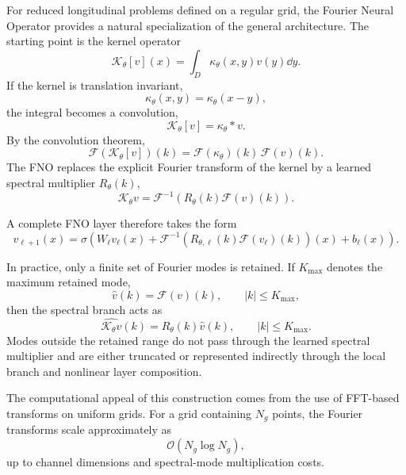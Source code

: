 For reduced longitudinal problems defined on a regular grid, the Fourier Neural Operator provides a natural specialization of the general architecture. The starting point is the kernel operator
\begin{equation}
\mathcal{K}_{\theta}[v](x)
=
\int_D
\kappa_{\theta}(x,y)
v(y)
\dd y.
\end{equation}
If the kernel is translation invariant,
\begin{equation}
\kappa_{\theta}(x,y)
=
\kappa_{\theta}(x-y),
\end{equation}
the integral becomes a convolution,
\begin{equation}
\mathcal{K}_{\theta}[v]
=
\kappa_{\theta}*v.
\end{equation}
By the convolution theorem,
\begin{equation}
\mathcal{F}
\left(
\mathcal{K}_{\theta}[v]
\right)(k)
=
\mathcal{F}
\left(
\kappa_{\theta}
\right)(k)
\,
\mathcal{F}(v)(k).
\end{equation}
The FNO replaces the explicit Fourier transform of the kernel by a learned spectral multiplier
$R_{\theta}(k)$,
\begin{equation}
\mathcal{K}_{\theta}v
=
\mathcal{F}^{-1}
\left(
R_{\theta}(k)
\mathcal{F}(v)(k)
\right).
\label{eq:fno_core_revised}
\end{equation}

A complete FNO layer therefore takes the form
\begin{equation}
v_{\ell+1}(x)
=
\sigma
\left(
W_{\ell}v_{\ell}(x)
+
\mathcal{F}^{-1}
\left(
R_{\theta,\ell}(k)
\mathcal{F}(v_{\ell})(k)
\right)(x)
+
b_{\ell}(x)
\right).
\label{eq:fno_layer_revised}
\end{equation}

In practice, only a finite set of Fourier modes is retained. If $K_{\max}$ denotes the maximum retained mode,
\begin{equation}
\widehat{v}(k)
=
\mathcal{F}(v)(k),
\qquad
|k|
\le
K_{\max},
\end{equation}
then the spectral branch acts as
\begin{equation}
\widehat{\mathcal{K}_{\theta}v}(k)
=
R_{\theta}(k)
\widehat{v}(k),
\qquad
|k|
\le
K_{\max}.
\label{eq:fno_mode_truncation}
\end{equation}
Modes outside the retained range do not pass through the learned spectral multiplier and are either truncated or represented indirectly through the local branch and nonlinear layer composition.

The computational appeal of this construction comes from the use of FFT-based transforms on uniform grids. For a grid containing $N_g$ points, the Fourier transforms scale approximately as
\begin{equation}
\mathcal{O}
\left(
N_g\log N_g
\right),
\end{equation}
up to channel dimensions and spectral-mode multiplication costs.

